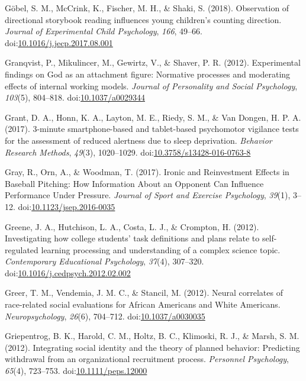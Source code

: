 \documentclass[english,man]{apa6}
\theoremstyle{definition}
\theoremstyle{definition}
\theoremstyle{definition}
\theoremstyle{remark}
\begin{document}
\hypertarget{ref-Gobel2018}{}
Göbel, S. M., McCrink, K., Fischer, M. H., \& Shaki, S. (2018).
Observation of directional storybook reading influences young children's
counting direction. \emph{Journal of Experimental Child Psychology},
\emph{166}, 49--66.
doi:\href{https://doi.org/10.1016/j.jecp.2017.08.001}{10.1016/j.jecp.2017.08.001}

\hypertarget{ref-Granqvist}{}
Granqvist, P., Mikulincer, M., Gewirtz, V., \& Shaver, P. R. (2012).
Experimental findings on God as an attachment figure: Normative
processes and moderating effects of internal working models.
\emph{Journal of Personality and Social Psychology}, \emph{103}(5),
804--818. doi:\href{https://doi.org/10.1037/a0029344}{10.1037/a0029344}

\hypertarget{ref-Grant2017a}{}
Grant, D. A., Honn, K. A., Layton, M. E., Riedy, S. M., \& Van Dongen,
H. P. A. (2017). 3-minute smartphone-based and tablet-based psychomotor
vigilance tests for the assessment of reduced alertness due to sleep
deprivation. \emph{Behavior Research Methods}, \emph{49}(3), 1020--1029.
doi:\href{https://doi.org/10.3758/s13428-016-0763-8}{10.3758/s13428-016-0763-8}

\hypertarget{ref-Gray2016}{}
Gray, R., Orn, A., \& Woodman, T. (2017). Ironic and Reinvestment
Effects in Baseball Pitching: How Information About an Opponent Can
Influence Performance Under Pressure. \emph{Journal of Sport and
Exercise Psychology}, \emph{39}(1), 3--12.
doi:\href{https://doi.org/10.1123/jsep.2016-0035}{10.1123/jsep.2016-0035}

\hypertarget{ref-Greene2012}{}
Greene, J. A., Hutchison, L. A., Costa, L. J., \& Crompton, H. (2012).
Investigating how college students' task definitions and plans relate to
self-regulated learning processing and understanding of a complex
science topic. \emph{Contemporary Educational Psychology}, \emph{37}(4),
307--320.
doi:\href{https://doi.org/10.1016/j.cedpsych.2012.02.002}{10.1016/j.cedpsych.2012.02.002}

\hypertarget{ref-Greer2012}{}
Greer, T. M., Vendemia, J. M. C., \& Stancil, M. (2012). Neural
correlates of race-related social evaluations for African Americans and
White Americans. \emph{Neuropsychology}, \emph{26}(6), 704--712.
doi:\href{https://doi.org/10.1037/a0030035}{10.1037/a0030035}

\hypertarget{ref-Griepentrog2012}{}
Griepentrog, B. K., Harold, C. M., Holtz, B. C., Klimoski, R. J., \&
Marsh, S. M. (2012). Integrating social identity and the theory of
planned behavior: Predicting withdrawal from an organizational
recruitment process. \emph{Personnel Psychology}, \emph{65}(4),
723--753.
doi:\href{https://doi.org/10.1111/peps.12000}{10.1111/peps.12000}
\end{document}
